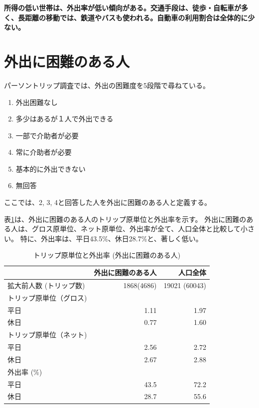 \documentclass[a4paper,12pt, uplatex]{jsbook}
\begin{document}
\color{red}
\begin{framed}
\noindent
\textbf{\large 所得の低い世帯は、外出率が低い傾向がある。交通手段は、徒歩・自転車が多く、長距離の移動では、鉄道やバスも使われる。自動車の利用割合は全体的に少ない。}
\end{framed}
\color{black}



\clearpage
\section{外出に困難のある人}
パーソントリップ調査では、外出の困難度を5段階で尋ねている。
\begin{enumerate}
  \item 外出困難なし
  \item 多少はあるが１人で外出できる
  \item 一部で介助者が必要
  \item 常に介助者が必要
  \item 基本的に外出できない
  \item 無回答
\end{enumerate}
ここでは、2, 3, 4と回答した人を外出に困難のある人と定義する。

表\ref{tab:トリップ_外出率_介助}は、外出に困難のある人のトリップ原単位と外出率を示す。
外出に困難のある人は、グロス原単位、ネット原単位、外出率が全て、人口全体と比較して小さい。
特に、外出率は、平日43.5\%、休日28.7\%と、著しく低い。
%
\begin{table}[htbp]
\centering
\caption{トリップ原単位と外出率 (外出に困難のある人)}
\label{tab:トリップ_外出率_介助}
\begin{tabular}{lrr}
\toprule
& 外出に困難のある人 & 人口全体 \\
\midrule
拡大前人数 (トリップ数) & 1868(4686) & 19021 (60043) \\
トリップ原単位（グロス) & & \\
\hspace{2em} 平日 & 1.11 & 1.97 \\
\hspace{2em} 休日 & 0.77 & 1.60 \\
トリップ原単位（ネット) & & \\
\hspace{2em} 平日 & 2.56 & 2.72 \\
\hspace{2em} 休日 & 2.67 & 2.88\\
外出率 (\%) & & \\
\hspace{2em} 平日 & 43.5 & 72.2\\
\hspace{2em} 休日 & 28.7 & 55.6\\
\bottomrule
\end{tabular}
\end{table}
\end{document}
